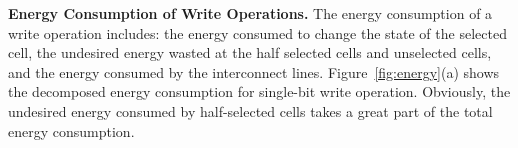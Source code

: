 \vspace{5pt}\noindent\textbf{Energy Consumption of Write Operations.}
%
The energy consumption of a write operation includes: the energy consumed
to change the state of the selected cell, the undesired energy wasted at
the half selected cells and unselected cells, and the energy consumed by
the interconnect lines.
Figure~\ref{fig:energy}(a) shows the decomposed energy consumption for
single-bit write operation. Obviously, the undesired energy consumed by
half-selected cells takes a great part of the total energy consumption.
